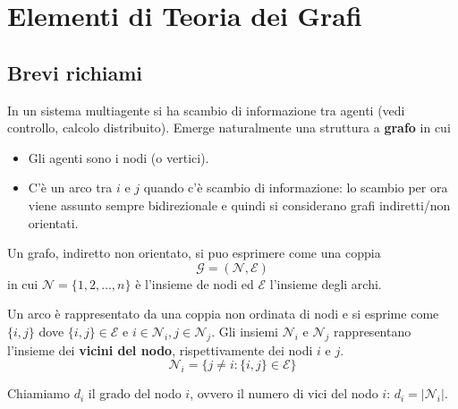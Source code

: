 \section{Elementi di Teoria dei Grafi}
\subsection{Brevi richiami}

In un sistema multiagente si ha scambio di informazione tra agenti (vedi controllo, calcolo distribuito). Emerge naturalmente una struttura a \textbf{grafo} in cui
\begin{itemize}
    \item Gli agenti sono i nodi (o vertici).
    \item C'\`e un arco tra $i$ e $j$ quando c'\`e scambio di informazione: lo scambio per ora viene assunto sempre bidirezionale e quindi si considerano grafi indiretti/non orientati.
\end{itemize}

Un grafo, indiretto non orientato, si puo esprimere come una coppia
\begin{equation}
\mathcal{G} = (\mathcal{N}, \mathcal{E})
\end{equation}
in cui $\mathcal{N} = \{1, 2, \dots, n \}$ \`e l'insieme de nodi ed $\mathcal{E}$ l'insieme degli archi. 

Un arco \`e rappresentato da una coppia non ordinata di nodi e si esprime come $\{i, j\}$ dove $\{i, j\} \in \mathcal{E}$ e $i \in \mathcal{N}_i, j \in \mathcal{N}_j$.
Gli insiemi $\mathcal{N}_i$ e $\mathcal{N}_j$ rappresentano l'insieme dei \textbf{vicini del nodo}, rispettivamente dei nodi $i$ e $j$.
\begin{equation}
    \mathcal{N}_i = \{j \neq i: \{i, j\} \in \mathcal{E} \}
\end{equation}

Chiamiamo $d_i$ il grado del nodo $i$, ovvero il numero di vici del nodo $i$: $d_i = |\mathcal{N}_i|$.

